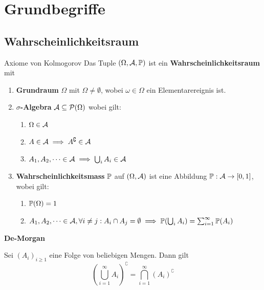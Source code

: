 \section{Grundbegriffe}
\subsection{Wahrscheinlichkeitsraum}
\begin{mainbox}{Axiome von Kolmogorov}
    Das Tuple $(\Omega, \A, \P)$ ist ein \textbf{Wahrscheinlichkeitsraum} mit 
    \begin{enumerate}[label=\Roman*.]
        \item \textbf{Grundraum} $\Omega$ mit $\Omega \neq \emptyset$, wobei $\omega \in \Omega$ ein Elementarereignis ist.
        \item \textbf{$\sigma$-Algebra} $\A \subseteq \Pset(\Omega)$ wobei gilt:
        \begin{enumerate}[label=\arabic*.]
            \item $\Omega \in \A$
            \item $A \in \A \implies A^\complement \in \A$
            \item $A_1,A_2,\dots \in \A \implies \bigcup_i A_i \in \A$
        \end{enumerate}
        \item \textbf{Wahrscheinlichkeitsmass} $\P$ auf $(\Omega, \A)$ ist eine Abbildung $\P: \A \to [0,1]$, wobei gilt:
        \begin{enumerate}[label=\arabic*.]
            \item $\P(\Omega) = 1$
            \item $A_1, A_2, \dots \in \A, \forall i \neq j: A_i \cap A_j = \emptyset \\ \implies \P(\bigcup_i A_i) = \sum_{i= 1}^\infty \P(A_i)$
        \end{enumerate}
    \end{enumerate}
\end{mainbox}

\textbf{De-Morgan}
    
Sei $(A_i)_{i \geq 1}$ eine Folge von beliebigen Mengen. Dann gilt
    $$\left(\bigcup_{i = 1}^{\infty}A_i\right)^\complement = \bigcap_{i = 1}^{\infty} (A_i)^\complement$$


